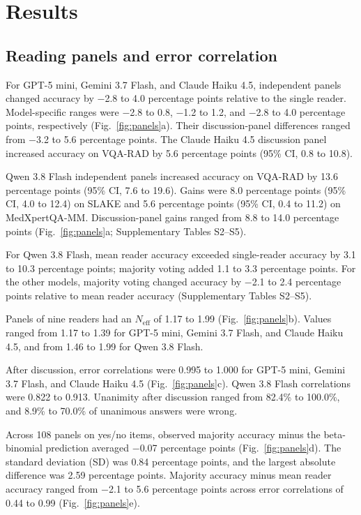 \section{Results}


\subsection{Reading panels and error correlation}
For GPT-5 mini, Gemini 3.7 Flash, and Claude Haiku 4.5, independent panels changed accuracy by $-$2.8 to 4.0 percentage points relative to the single reader. Model-specific ranges were $-$2.8 to 0.8, $-$1.2 to 1.2, and $-$2.8 to 4.0 percentage points, respectively (Fig.~\ref{fig:panels}a). Their discussion-panel differences ranged from $-$3.2 to 5.6 percentage points. The Claude Haiku 4.5 discussion panel increased accuracy on VQA-RAD by 5.6 percentage points (95\% CI, 0.8 to 10.8).

Qwen 3.8 Flash independent panels increased accuracy on VQA-RAD by 13.6 percentage points (95\% CI, 7.6 to 19.6). Gains were 8.0 percentage points (95\% CI, 4.0 to 12.4) on SLAKE and 5.6 percentage points (95\% CI, 0.4 to 11.2) on MedXpertQA-MM. Discussion-panel gains ranged from 8.8 to 14.0 percentage points (Fig.~\ref{fig:panels}a; Supplementary Tables S2--S5).

For Qwen 3.8 Flash, mean reader accuracy exceeded single-reader accuracy by 3.1 to 10.3 percentage points; majority voting added 1.1 to 3.3 percentage points. For the other models, majority voting changed accuracy by $-$2.1 to 2.4 percentage points relative to mean reader accuracy (Supplementary Tables S2--S5).

Panels of nine readers had an $N_{\mathrm{eff}}$ of 1.17 to 1.99 (Fig.~\ref{fig:panels}b). Values ranged from 1.17 to 1.39 for GPT-5 mini, Gemini 3.7 Flash, and Claude Haiku 4.5, and from 1.46 to 1.99 for Qwen 3.8 Flash.

After discussion, error correlations were 0.995 to 1.000 for GPT-5 mini, Gemini 3.7 Flash, and Claude Haiku 4.5 (Fig.~\ref{fig:panels}c). Qwen 3.8 Flash correlations were 0.822 to 0.913. Unanimity after discussion ranged from 82.4\% to 100.0\%, and 8.9\% to 70.0\% of unanimous answers were wrong.

Across 108 panels on yes/no items, observed majority accuracy minus the beta-binomial prediction averaged $-$0.07 percentage points (Fig.~\ref{fig:panels}d). The standard deviation (SD) was 0.84 percentage points, and the largest absolute difference was 2.59 percentage points. Majority accuracy minus mean reader accuracy ranged from $-$2.1 to 5.6 percentage points across error correlations of 0.44 to 0.99 (Fig.~\ref{fig:panels}e).

